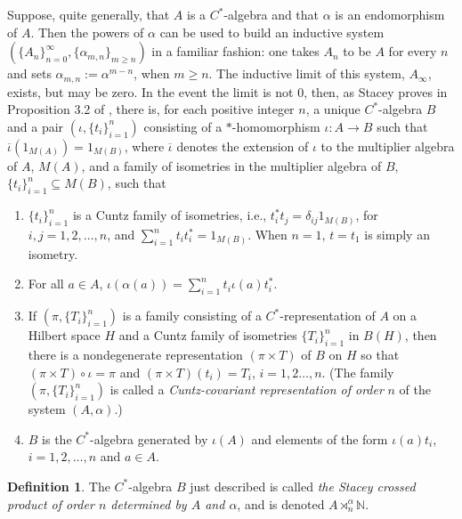 \documentclass{amsproc}
\theoremstyle{plain}
\theoremstyle{definition}
\theoremstyle{definition}
\newtheorem{defn}[thm]{Definition}
\theoremstyle{remark}
\theoremstyle{plain}
\begin{document}
Suppose, quite generally, that $A$ is a $C^{*}$-algebra and that
$\alpha$ is an endomorphism of $A$. Then the powers of $\alpha$
can be used to build an inductive system $(\{
A_{n}\}_{n=0}^{\infty},\{\alpha_{m,n}\}_{m\geq n})$
in a familiar fashion: one takes $A_{n}$ to be $A$ for every $n$
and sets $\alpha_{m,n}:=\alpha^{m-n}$, when $m\geq n$. The inductive
limit of this system, $A_{\infty}$, exists, but may be zero. In the
event the limit is not $0$, then, as Stacey proves in Proposition
3.2 of \cite{pS93}, there is, for each positive integer $n$, a unique
$C^{*}$-algebra $B$ and a pair $(\iota,\{ t_{i}\}_{i=1}^{n})$ consisting
of a $*$-homomorphism $\iota:A\to B$ such that
$\overline{\iota}(1_{M(A)})=1_{M(B)}$,
where $\overline{\iota}$ denotes the extension of $\iota$ to the
multiplier algebra of $A$, $M(A)$, and a family of isometries in
the multiplier algebra of $B$, $\{ t_{i}\}_{i=1}^{n}\subseteq M(B)$,
such that

\begin{enumerate}
\item $\{ t_{i}\}_{i=1}^{n}$ is a Cuntz family of isometries, i.e.,
$t_{i}^{*}t_{j}=\delta_{ij}1_{M(B)}$,
for $i,j=1,2,\ldots,n$, and $\sum_{i=1}^{n}t_{i}t_{i}^{*}=1_{M(B)}$.
When $n=1$, $t=t_{1}$ is simply an isometry.
\item For all $a\in A$, $\iota(\alpha(a))=\sum_{i=1}^{n}t_{i}\iota(a)t_{i}^{*}$.
\item If $(\pi,\{ T_{i}\}_{i=1}^{n})$ is a family consisting of a
$C^{*}$-representation
of $A$ on a Hilbert space $H$ and a Cuntz family of isometries $\{
T_{i}\}_{i=1}^{n}$
in $B(H)$, then there is a nondegenerate representation $(\pi\times T)$
of $B$ on $H$ so that $(\pi\times T)\circ\iota=\pi$ and $(\pi\times
T)(t_{i})=T_{i}$,
$i=1,2\ldots,n$. (The family $(\pi,\{ T_{i}\}_{i=1}^{n})$ is called
a \emph{Cuntz-covariant representation of order} $n$ of the system
$(A,\alpha)$.) 
\item $B$ is the $C^{*}$-algebra generated by $\iota(A)$ and elements
of the form $\iota(a)t_{i}$, $i=1,2,\ldots,n$ and $a\in A$. 
\end{enumerate}
\begin{defn}
The $C^{*}$-algebra $B$ just described is called \emph{the Stacey
crossed product of order $n$ determined by $A$ and $\alpha$}, and
is denoted $A\rtimes_{n}^{\alpha}\mathbb{N}$. \end{defn}
\end{document}
